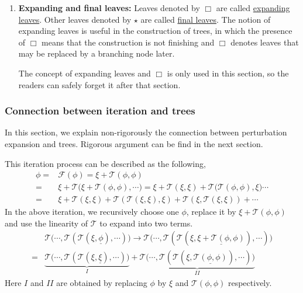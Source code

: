 \begin{defn}
\begin{enumerate}
    
    \item \textbf{Expanding and final leaves:} Leaves denoted by $\Box$ are called \underline{expanding leaves}. Other leaves denoted by $\star$ are called \underline{final leaves}. The notion of expanding leaves is useful in the construction of trees, in which the presence of $\Box$ means that the construction is not finishing and $\Box$ denotes leaves that may be replaced by a branching node later.
    
    The concept of expanding leaves and $\Box$ is only used in this section, so the readers can safely forget it after that section.
\end{enumerate}

    


\end{defn}





\subsubsection{Connection between iteration and trees}\label{sec.connection} In this section, we explain non-rigorously the connection between perturbation expansion and trees. Rigorous argument can be find in the next section. 

This iteration process can be described as the following, 
\begin{equation*}
\begin{split}
    \phi=&\mathcal{F}(\phi)=\xi+\mathcal{T}(\phi,\phi)
    \\
    =&\xi+\mathcal{T}\Big(\xi+\mathcal{T}(\phi,\phi),
    \cdots\Big)=\xi+\mathcal{T}(\xi,\xi)+\mathcal{T}\Big(\mathcal{T}(\phi,\phi),
    \xi\Big)\cdots
    \\
    =&\xi+\mathcal{T}(\xi,\xi)+\mathcal{T}(\mathcal{T}(\xi,\xi),\xi)
    +\mathcal{T}(\xi,\mathcal{T}(\xi,\xi))+\cdots
\end{split}    
\end{equation*}
In the above iteration, we recursively choose one $\phi$, replace it by $\xi+\mathcal{T}(\phi,\phi)$ and use the linearity of $\mathcal{T}$ to expand into two terms.
\begin{equation}\label{eq.termgeneration.threewave}
\begin{split}
    &\mathcal{T}\Big(\cdots,\mathcal{T}(\mathcal{T}(\xi,\underline{\phi}),\cdots)\Big)\rightarrow \mathcal{T}\Big(\cdots,\mathcal{T}(\mathcal{T}(\xi,\underline{\xi+\mathcal{T}(\phi,\phi)}),\cdots)\Big)
    \\
    =& \underbrace{\mathcal{T}\Big(\cdots,\mathcal{T}(\mathcal{T}(\xi,\underline{\xi}),\cdots)\Big)}_{I}
    +\underbrace{\mathcal{T}\Big(\cdots,\mathcal{T}(\mathcal{T}(\xi,\underline{\mathcal{T}(\phi,\phi)}),\cdots)\Big)}_{II}
\end{split}        
\end{equation}
Here $I$ and $II$ are obtained by replacing $\phi$ by $\xi$ and $\mathcal{T}(\phi,\phi)$ respectively.

